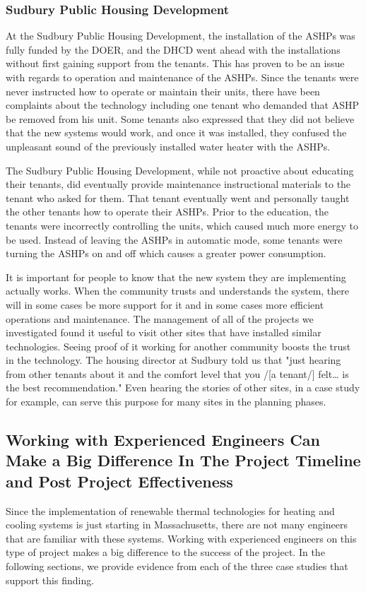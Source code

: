 \subsubsection{Sudbury Public Housing Development}
\par At the Sudbury Public Housing Development, the installation of the ASHPs was fully funded by the DOER, and the DHCD went ahead with the installations without first gaining support from the tenants. This has proven to be an issue with regards to operation and maintenance of the ASHPs. Since the tenants were never instructed how to operate or maintain their units, there have been complaints about the technology including one tenant who demanded that ASHP be removed from his unit. Some tenants also expressed that they did not believe that the new systems would work, and once it was installed, they confused the unpleasant sound of the previously installed water heater with the ASHPs.
\par The Sudbury Public Housing Development, while not proactive about educating their tenants, did eventually provide maintenance instructional materials to the tenant who asked for them. That tenant eventually went and personally taught the other tenants how to operate their ASHPs. Prior to the education, the tenants were incorrectly controlling the units, which caused much more energy to be used. Instead of leaving the ASHPs in automatic mode, some tenants were turning the ASHPs on and off which causes a greater power consumption.
\par It is important for people to know that the new system they are implementing actually works. When the community trusts and understands the system, there will in some cases be more support for it and in some cases more efficient operations and maintenance. The management of all of the projects we investigated found it useful to visit other sites that have installed similar technologies. Seeing proof of it working for another community boosts the trust in the technology. The housing director at Sudbury told us that "just hearing from other tenants about it and the comfort level that you /[a tenant/] felt… is the best recommendation." Even hearing the stories of other sites, in a case study for example, can serve this purpose for many sites in the planning phases.

\subsection{Working with Experienced Engineers Can Make a Big Difference In The Project Timeline and Post Project Effectiveness}
\par Since the implementation of renewable thermal technologies for heating and cooling systems is just starting in Massachusetts, there are not many engineers that are familiar with these systems. Working with experienced engineers on this type of project makes a big difference to the success of the project. In the following sections, we provide evidence from each of the three case studies that support this finding.

